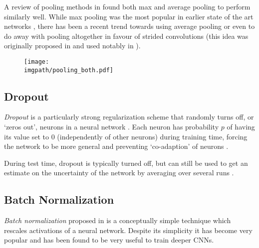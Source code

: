 A review of pooling methods in \cite{mishkin_systematic_2017} found both
max and average pooling to perform similarly well. While max pooling was the most
popular in earlier state of the art networks \cite{krizhevsky_imagenet_2012,
simonyan_very_2014}, there has been a recent trend towards using average pooling
\cite{huang_densely_2017} or even to do away with pooling altogether in favour
of strided convolutions (this idea was originally proposed in
\cite{springenberg_striving_2015} and used notably in \cite{he_deep_2016,
xie_aggregated_2017, zagoruyko_wide_2016}).

\begin{figure}
  \centering
  \texttt{[image: \\imgpath/pooling\_both.pdf]}
  \label{fig:ch2:maxpool}
\end{figure}

\subsection{Dropout}
\emph{Dropout} is a particularly strong regularization scheme that randomly turns off,
or `zeros out', neurons in a neural network \cite{hinton_improving_2012, srivastava_dropout:_2014}.
Each neuron has probability $p$ of having its value set to 0 (independently of
other neurons) during training
time, forcing the network to be more general and preventing `co-adaption' of
neurons \cite{srivastava_dropout:_2014}.

During test time, dropout is typically turned off, but can still be
used to get an estimate on the uncertainty of the network by averaging over
several runs \cite{gal_dropout_2016}.

\subsection{Batch Normalization}
\emph{Batch normalization} proposed in \cite{ioffe_batch_2015} is a conceptually
simple technique which rescales activations of a neural network. Despite its
simplicity it has become very popular and has been found to be very useful to
train deeper CNNs.

